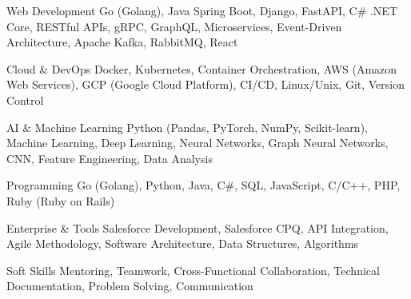 

\begin{cvskills}

  \cvskill
    {Web Development} %
    {Go (Golang), Java Spring Boot, Django, FastAPI, C\# .NET Core, RESTful APIs, gRPC, GraphQL, Microservices, Event-Driven Architecture, Apache Kafka, RabbitMQ, React} %

  \cvskill
    {Cloud \& DevOps} %
    {Docker, Kubernetes, Container Orchestration, AWS (Amazon Web Services), GCP (Google Cloud Platform), CI/CD, Linux/Unix, Git, Version Control} %

  \cvskill
    {AI \& Machine Learning} %
    {Python (Pandas, PyTorch, NumPy, Scikit-learn), Machine Learning, Deep Learning, Neural Networks, Graph Neural Networks, CNN, Feature Engineering, Data Analysis} %
    
  \cvskill
    {Programming} %
    {Go (Golang), Python, Java, C\#, SQL, JavaScript, C/C++, PHP, Ruby (Ruby on Rails)} %

  \cvskill
    {Enterprise \& Tools} %
    {Salesforce Development, Salesforce CPQ, API Integration, Agile Methodology, Software Architecture, Data Structures, Algorithms} %

  \cvskill
    {Soft Skills} %
    {Mentoring, Teamwork, Cross-Functional Collaboration, Technical Documentation, Problem Solving, Communication} %

\end{cvskills}
